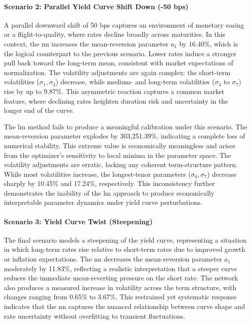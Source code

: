\paragraph{Scenario 2: Parallel Yield Curve Shift Down (-50 \ac{bps})}
A parallel downward shift of 50 \ac{bps} captures an environment of monetary easing or a flight-to-quality, where rates decline broadly across maturities. In this context, the \ac{nn} increases the mean-reversion parameter \( a_1 \) by 16.40\%, which is the logical counterpart to the previous scenario. Lower rates induce a stronger pull back toward the long-term mean, consistent with market expectations of normalization. The volatility adjustments are again complex: the short-term volatilities (\( \sigma_1, \sigma_2 \)) decrease, while medium- and long-term volatilities (\( \sigma_3 \) to \( \sigma_7 \)) rise by up to 9.87\%. This asymmetric reaction captures a common market feature, where declining rates heighten duration risk and uncertainty in the longer end of the curve.

The \ac{lm} method fails to produce a meaningful calibration under this scenario. The mean-reversion parameter explodes by 303,251.39\%, indicating a complete loss of numerical stability. This extreme value is economically meaningless and arises from the optimizer's sensitivity to local minima in the parameter space. The volatility adjustments are erratic, lacking any coherent term-structure pattern. While most volatilities increase, the longest-tenor parameters (\( \sigma_6, \sigma_7 \)) decrease sharply by 10.45\% and 17.24\%, respectively. This inconsistency further demonstrates the inability of the \ac{lm} approach to produce economically interpretable parameter dynamics under yield curve perturbations.

\paragraph{Scenario 3: Yield Curve Twist (Steepening)}
The final scenario models a steepening of the yield curve, representing a situation in which long-term rates rise relative to short-term rates due to improved growth or inflation expectations. The \ac{nn} decreases the mean-reversion parameter \( a_1 \) moderately by 11.83\%, reflecting a realistic interpretation that a steeper curve reduces the immediate mean-reverting pressure on the short rate. The network also produces a measured increase in volatility across the term structure, with changes ranging from 0.65\% to 3.67\%. This restrained yet systematic response indicates that the \ac{nn} captures the nuanced relationship between curve shape and rate uncertainty without overfitting to transient fluctuations.

